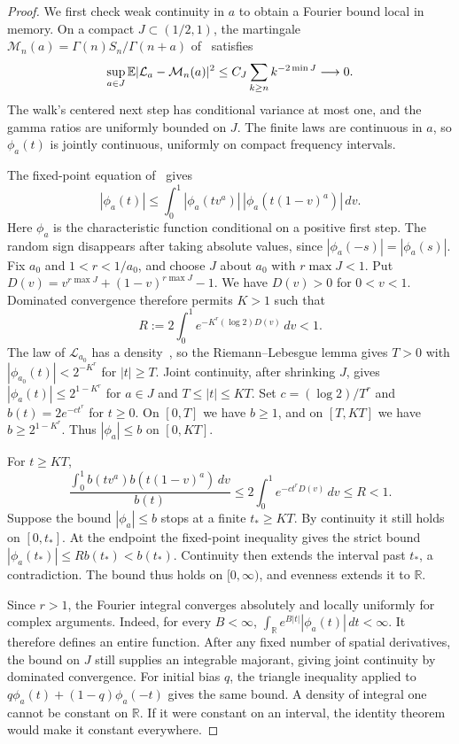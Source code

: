 \begin{proof}
We first check weak continuity in $a$ to obtain a Fourier bound local in memory. On a compact
$J\subset(1/2,1)$, the martingale
$\mathcal M_n(a)=\Gamma(n)S_n/\Gamma(n+a)$ of~\cite[(2.4), Appendix~A]{bercu2018} satisfies
\[
 \sup_{a\in J}\mathbb{E}|\mathcal L_a-\mathcal M_n(a)|^2
 \le C_J\sum_{k\ge n}k^{-2\min J}\longrightarrow0.
\]
The walk's centered next step has conditional variance at most one,
and the gamma ratios are uniformly bounded on $J$. The finite laws are
continuous in $a$, so $\phi_a(t)$ is jointly continuous, uniformly on
compact frequency intervals.

The fixed-point equation of~\cite[Theorem~1.1 and (2.10)]{glr2026} gives
\[
 |\phi_a(t)|\le\int_0^1|\phi_a(tv^a)|\,
                  |\phi_a(t(1-v)^a)|\,dv.
\]
Here $\phi_a$ is the characteristic function conditional on a positive
first step. The random sign disappears after taking absolute values, since
$|\phi_a(-s)|=|\phi_a(s)|$.
Fix $a_0$ and $1<r<1/a_0$, and choose $J$ about $a_0$ with $r\max J<1$.
Put $D(v)=v^{r\max J}+(1-v)^{r\max J}-1$. We have $D(v)>0$ for
$0<v<1$. Dominated convergence therefore permits $K>1$ such that
\[
 R:=2\int_0^1e^{-K^r(\log2)D(v)}\,dv<1.
\]
The law of $\mathcal L_{a_0}$ has a density~\cite[Theorem~1.3]{glr2026}, so
the Riemann--Lebesgue lemma gives $T>0$ with
$|\phi_{a_0}(t)|<2^{-K^r}$ for $|t|\ge T$. Joint continuity, after
shrinking $J$, gives $|\phi_a(t)|\le2^{1-K^r}$ for $a\in J$ and
$T\le|t|\le KT$. Set
$c=(\log2)/T^r$ and $b(t)=2e^{-ct^r}$ for $t\ge0$.
On $[0,T]$ we have $b\ge1$, and on $[T,KT]$ we have
$b\ge2^{1-K^r}$. Thus $|\phi_a|\le b$ on $[0,KT]$.

For $t\ge KT$,
\[
 \frac{\int_0^1b(tv^a)b(t(1-v)^a)\,dv}{b(t)}
 \le2\int_0^1e^{-ct^rD(v)}\,dv\le R<1.
\]
Suppose the bound $|\phi_a|\le b$ stops at a finite
$t_*\ge KT$. By continuity it still holds on $[0,t_*]$.
At the endpoint the fixed-point inequality gives the strict bound
$|\phi_a(t_*)|\le Rb(t_*)<b(t_*)$. Continuity then extends the
interval past $t_*$, a contradiction. The bound thus holds on
$[0,\infty)$, and evenness extends it to $\mathbb R$.

Since $r>1$, the Fourier integral converges absolutely and locally
uniformly for complex arguments. Indeed, for every $B<\infty$,
$\int_{\mathbb R}e^{B|t|}|\phi_a(t)|\,dt<\infty$.
It therefore defines an entire function.
After any fixed number of spatial derivatives, the bound on $J$
still supplies an integrable majorant, giving joint continuity by
dominated convergence. For initial bias $q$, the triangle inequality
applied to $q\phi_a(t)+(1-q)\phi_a(-t)$ gives the same bound.
A density of integral one cannot be constant on $\mathbb R$.
If it were constant on an interval, the identity theorem would
make it constant everywhere.


\end{proof}
